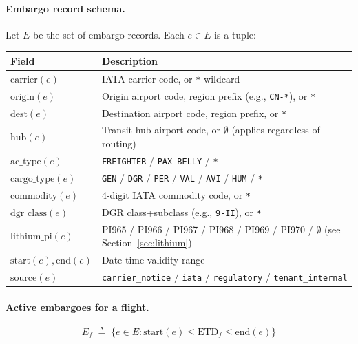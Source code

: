 \documentclass[11pt,a4paper]{article}
\newcommand{\defeq}{\triangleq}
\theoremstyle{definition}
\begin{document}
\paragraph{Embargo record schema.}
Let \(E\) be the set of embargo records. Each \(e \in E\) is a tuple:
\begin{center}
\begin{tabular}{lp{9cm}}
\toprule
Field & Description \\
\midrule
\(\text{carrier}(e)\) & IATA carrier code, or \texttt{*} wildcard \\
\(\text{origin}(e)\) & Origin airport code, region prefix (e.g., \texttt{CN-*}), or \texttt{*} \\
\(\text{dest}(e)\) & Destination airport code, region prefix, or \texttt{*} \\
\(\text{hub}(e)\) & Transit hub airport code, or \(\emptyset\) (applies regardless of routing) \\
\(\text{ac\_type}(e)\) & \texttt{FREIGHTER} / \texttt{PAX\_BELLY} / \texttt{*} \\
\(\text{cargo\_type}(e)\) & \texttt{GEN} / \texttt{DGR} / \texttt{PER} / \texttt{VAL} / \texttt{AVI} / \texttt{HUM} / \texttt{*} \\
\(\text{commodity}(e)\) & 4-digit IATA commodity code, or \texttt{*} \\
\(\text{dgr\_class}(e)\) & DGR class+subclass (e.g., \texttt{9-II}), or \texttt{*} \\
\(\text{lithium\_pi}(e)\) & PI965 / PI966 / PI967 / PI968 / PI969 / PI970 / \(\emptyset\) (see Section~\ref{sec:lithium}) \\
\(\text{start}(e), \text{end}(e)\) & Date-time validity range \\
\(\text{source}(e)\) & \texttt{carrier\_notice} / \texttt{iata} / \texttt{regulatory} / \texttt{tenant\_internal} \\
\bottomrule
\end{tabular}
\end{center}

\paragraph{Active embargoes for a flight.}
\begin{equation}
  E_f \;\defeq\; \{ e \in E : \text{start}(e) \leq \text{ETD}_f \leq \text{end}(e) \}
  \label{eq:active-embargoes}
\end{equation}
\end{document}
